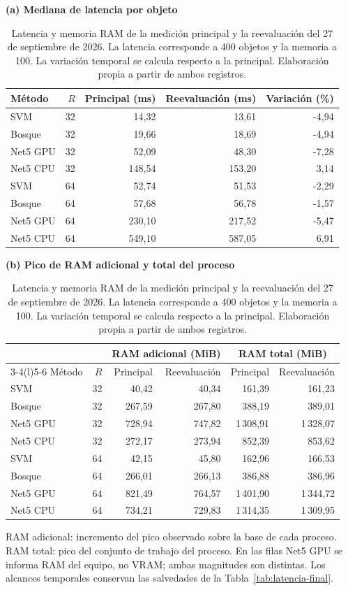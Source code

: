 \begin{table}[htbp]\centering\small
\caption{Latencia y memoria RAM de la medición principal y la reevaluación del 27 de septiembre de 2026. La latencia corresponde a 400 objetos y la memoria a 100. La variación temporal se calcula respecto a la principal. Elaboración propia a partir de ambos registros.}\label{tab:reevaluacion-final}
\setlength{\tabcolsep}{4pt}
\textbf{(a) Mediana de latencia por objeto}\par\smallskip
\begin{tabular}{@{}lrrrr@{}}\toprule
Método & $R$ & Principal (ms) & Reevaluación (ms) & Variación (\%) \\\midrule
SVM & 32 & 14,32 & 13,61 & -4,94 \\
Bosque & 32 & 19,66 & 18,69 & -4,94 \\
Net5 GPU & 32 & 52,09 & 48,30 & -7,28 \\
Net5 CPU & 32 & 148,54 & 153,20 & 3,14 \\
SVM & 64 & 52,74 & 51,53 & -2,29 \\
Bosque & 64 & 57,68 & 56,78 & -1,57 \\
Net5 GPU & 64 & 230,10 & 217,52 & -5,47 \\
Net5 CPU & 64 & 549,10 & 587,05 & 6,91 \\
\bottomrule\end{tabular}
\par\medskip\textbf{(b) Pico de RAM adicional y total del proceso}\par\smallskip
\begin{tabular}{@{}lr rrrr@{}}\toprule
& & \multicolumn{2}{c}{RAM adicional (MiB)} & \multicolumn{2}{c}{RAM total (MiB)} \\
\cmidrule(lr){3-4}\cmidrule(l){5-6}
Método & $R$ & Principal & Reevaluación & Principal & Reevaluación \\\midrule
SVM & 32 & 40,42 & 40,34 & 161,39 & 161,23 \\
Bosque & 32 & 267,59 & 267,80 & 388,19 & 389,01 \\
Net5 GPU & 32 & 728,94 & 747,82 & 1\,308,91 & 1\,328,07 \\
Net5 CPU & 32 & 272,17 & 273,94 & 852,39 & 853,62 \\
SVM & 64 & 42,15 & 45,80 & 162,96 & 166,53 \\
Bosque & 64 & 266,01 & 266,13 & 386,88 & 386,96 \\
Net5 GPU & 64 & 821,49 & 764,57 & 1\,401,90 & 1\,344,72 \\
Net5 CPU & 64 & 734,21 & 729,83 & 1\,314,35 & 1\,309,95 \\
\bottomrule\end{tabular}
\par\smallskip\begin{minipage}{\textwidth}\footnotesize
RAM adicional: incremento del pico observado sobre la base de cada proceso. RAM total: pico del conjunto de trabajo del proceso. En las filas Net5 GPU se informa RAM del equipo, no VRAM; ambas magnitudes son distintas. Los alcances temporales conservan las salvedades de la Tabla~\ref{tab:latencia-final}.\end{minipage}
\end{table}
